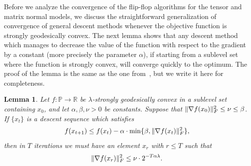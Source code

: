 \documentclass[aos]{imsart}
\newtheorem{lemma}[theorem]{Lemma}
\theoremstyle{definition}
\numberwithin{equation}{section}
\DeclarePairedDelimiter{\norm}{\lVert}{\rVert}
\newcommand{\R}{{\mathbb{R}}}
\newcommand{\SPD}{\mathbb{P}}
\begin{document}
Before we analyze the convergence of the flip-flop algorithms for the tensor and matrix normal models, we discuss the straightforward generalization of convergence of general descent methods whenever the objective function is strongly geodesically convex.
The next lemma shows that any descent method which manages to decrease the value of the function with respect to the gradient by a constant (more precisely the parameter $\alpha$), if starting from a sublevel set where the function is strongly convex, will converge quickly to the optimum.
The proof of the lemma is the same as the one from~\cite[Lemma 4.8]{FM20}, but we write it here for completeness.

\begin{lemma}\label{lem:descent-sublevel-set}
	Let $f : \SPD \rightarrow \R$ be $\lambda$-strongly geodesically convex in a sublevel set containing $x_0$, and let $\alpha, \beta, \nu > 0$ be constants. Suppose that $\norm{\nabla f(x_0)}_F^2 \leq \nu \leq \beta$.
	If $\{x_t\}$ is a descent sequence which satisfies
	$$ f(x_{t+1}) \leq f(x_t) - \alpha \cdot \min\{\beta,  \norm{\nabla f(x_t)}^2_F \},$$
	then in $T$ iterations we must have an element $x_r$ with $r \leq T$ such that
	$$ \norm{\nabla f(x_r)}^2_F \leq \nu \cdot 2^{- T \alpha \lambda}.   $$
\end{lemma}
\end{document}
